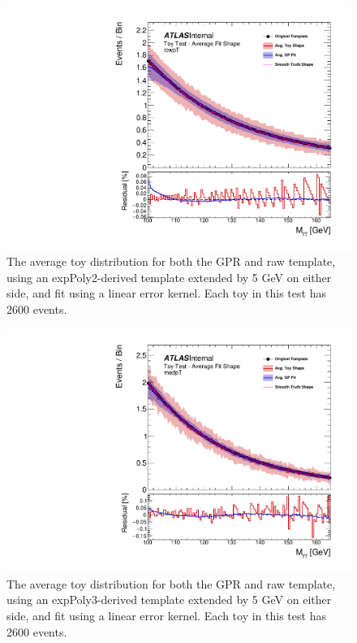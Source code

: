 \begin{figure} 
\begin{center}
  \includegraphics[width=\textwidth]{figures/background/gpr/validation/linear/ToyTest_AvgFitShape_lowpT_2600_noSig}   
\caption{The average toy distribution for both the GPR and raw template, using an expPoly2-derived template extended by 5 GeV on either side, and fit using a linear error kernel. Each toy in this test has 2600 events.}
\label{fig:linearkernel_lowpt_2600_noSig}
\end{center}
\end{figure}

\begin{figure} 
\begin{center}
  \includegraphics[width=\textwidth]{figures/background/gpr/validation/linear/ToyTest_AvgFitShape_medpT_2600_noSig}   
\caption{The average toy distribution for both the GPR and raw template, using an expPoly3-derived template extended by 5 GeV on either side, and fit using a linear error kernel. Each toy in this test has 2600 events.}
\label{fig:linearkernel_medpt_2600_noSig}
\end{center}
\end{figure}

